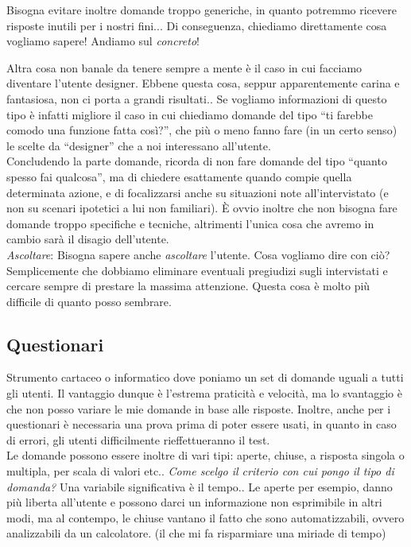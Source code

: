 \documentclass[oneside]{book}
\begin{document}
			Bisogna evitare inoltre domande troppo generiche, in quanto potremmo ricevere risposte inutili per i nostri fini... Di conseguenza, chiediamo direttamente cosa vogliamo sapere! Andiamo sul \emph{concreto}!

			Altra cosa non banale da tenere sempre a mente è il caso in cui facciamo diventare l'utente designer. Ebbene questa cosa, seppur apparentemente carina e fantasiosa, non ci porta a grandi risultati.. Se vogliamo informazioni di questo tipo è infatti migliore il caso in cui chiediamo domande del tipo ``ti farebbe comodo una funzione fatta così?'', che più o meno fanno fare (in un certo senso) le scelte da ``designer'' che a noi interessano all'utente. \\

			Concludendo la parte domande, ricorda di non fare domande del tipo ``quanto spesso fai qualcosa'', ma di chiedere esattamente quando compie quella determinata azione, e di focalizzarsi anche su situazioni note all'intervistato (e non su scenari ipotetici a lui non familiari). È ovvio inoltre che non bisogna fare domande troppo specifiche e tecniche, altrimenti l'unica cosa che avremo in cambio sarà il disagio dell'utente. \\

			\emph{Ascoltare}: Bisogna sapere anche \emph{ascoltare} l'utente. Cosa vogliamo dire con ciò? Semplicemente che dobbiamo eliminare eventuali pregiudizi sugli intervistati e cercare sempre di prestare la massima attenzione. Questa cosa è molto più difficile di quanto posso sembrare.

		\subsection{Questionari}
			Strumento cartaceo o informatico dove poniamo un set di domande uguali a tutti gli utenti. Il vantaggio dunque è l'estrema praticità e velocità, ma lo svantaggio è che non posso variare le mie domande in base alle risposte. Inoltre, anche per i questionari è necessaria una prova prima di poter essere usati, in quanto in caso di errori, gli utenti difficilmente rieffettueranno il test. \\

			Le domande possono essere inoltre di vari tipi: aperte, chiuse, a risposta singola o multipla, per scala di valori etc.. \emph{Come scelgo il criterio con cui pongo il tipo di domanda?} Una variabile significativa è il tempo.. Le aperte per esempio, danno più liberta all'utente e possono darci un informazione non esprimibile in altri modi, ma al contempo, le chiuse vantano il fatto che sono automatizzabili, ovvero analizzabili da un calcolatore. (il che mi fa risparmiare una miriade di tempo)\\
\end{document}
